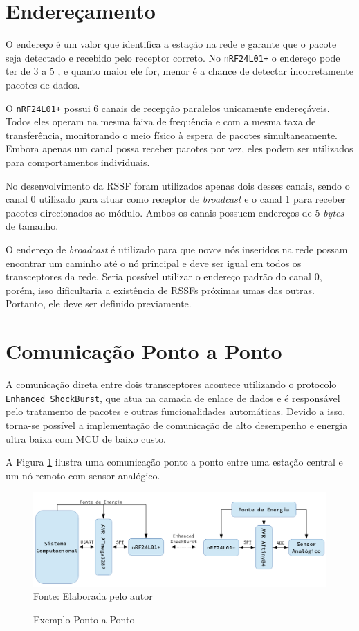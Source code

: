 \section{Endereçamento}
O endereço é um valor que identifica a estação na rede e garante que o pacote seja detectado e recebido pelo
receptor correto. No \texttt{nRF24L01+} o endereço pode ter de 3 a 5 , e quanto maior ele for,
menor é a chance de detectar incorretamente pacotes de dados.

O \texttt{nRF24L01+} possui 6 canais de recepção paralelos unicamente endereçáveis. Todos eles operam na mesma
faixa de frequência e com a mesma taxa de transferência, monitorando o meio físico à espera de pacotes
simultaneamente. Embora apenas um canal possa receber pacotes por vez, eles podem ser utilizados para
comportamentos individuais.

No desenvolvimento da RSSF foram utilizados apenas dois desses canais, sendo o canal 0 utilizado para atuar
como receptor de \textit{broadcast} e o canal 1 para receber pacotes direcionados ao módulo. Ambos os canais
possuem endereços de 5 \textit{bytes} de tamanho.

O endereço de \textit{broadcast} é utilizado para que novos nós inseridos na rede possam encontrar um caminho
até o nó principal e deve ser igual em todos os transceptores da rede. Seria possível utilizar o endereço
padrão do canal 0, porém, isso dificultaria a existência de RSSFs próximas umas das outras. Portanto, ele deve
ser definido previamente.

\section{Comunicação Ponto a Ponto}
A comunicação direta entre dois transceptores acontece utilizando o protocolo \texttt{Enhanced ShockBurst},
que atua na camada de enlace de dados e é responsável pelo tratamento de pacotes e outras funcionalidades
automáticas. Devido a isso, torna-se possível a implementação de comunicação de alto desempenho e energia
ultra baixa com MCU de baixo custo.

A Figura \ref{figura:point_to_point} ilustra uma comunicação ponto a ponto entre uma estação central e um nó
remoto com sensor analógico.

\begin{figure}[h!]
	\caption{Exemplo Ponto a Ponto}
	\centering
	\includegraphics[width=\textwidth]{../images/diagrama_ponto_a_ponto.png}
	\hspace{\linewidth}
	Fonte: Elaborada pelo autor
	\label{figura:point_to_point}
\end{figure}


